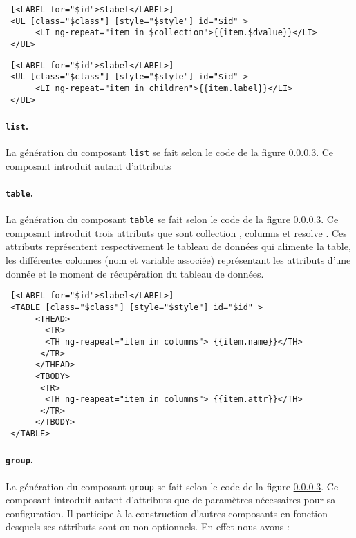 \documentclass[a4paper,11pt]{report}
\begin{document}
\begin{verbatim}
 [<LABEL for="$id">$label</LABEL>]
 <UL [class="$class"] [style="$style"] id="$id" >
      <LI ng-repeat="item in $collection">{{item.$dvalue}}</LI>
 </UL>     
\end{verbatim}

\begin{verbatim}
 [<LABEL for="$id">$label</LABEL>]
 <UL [class="$class"] [style="$style"] id="$id" >
      <LI ng-repeat="item in children">{{item.label}}</LI>
 </UL>     
\end{verbatim}

\paragraph{{\tt list}.}La génération du composant {\tt list} se fait selon le code de la figure \ref{}. Ce composant introduit autant d'attributs


\paragraph{{\tt table}.}La génération du composant {\tt table} se fait selon le code de la figure \ref{}. Ce composant introduit trois attributs que sont
\og collection \fg, \og columns \fg et \og resolve \fg . Ces attributs représentent respectivement le tableau de données qui alimente la table, les différentes
colonnes (nom et variable associée)  représentant les attributs d'une donnée et le moment de récupération du tableau de données.

\begin{verbatim}
 [<LABEL for="$id">$label</LABEL>]
 <TABLE [class="$class"] [style="$style"] id="$id" >
      <THEAD>
	    <TR>
		<TH ng-reapeat="item in columns"> {{item.name}}</TH>
	   </TR>
      </THEAD>
      <TBODY>
	   <TR>
		<TH ng-reapeat="item in columns"> {{item.attr}}</TH>
	   </TR>
      </TBODY>
 </TABLE>     
\end{verbatim}



\paragraph{{\tt group}.}La génération du composant {\tt group} se fait selon le code de la figure \ref{}. Ce composant introduit autant d'attributs
que de paramètres nécessaires pour sa configuration. Il participe à la construction d'autres composants en fonction desquels 
ses attributs sont ou non  optionnels. En effet nous avons :
\end{document}

